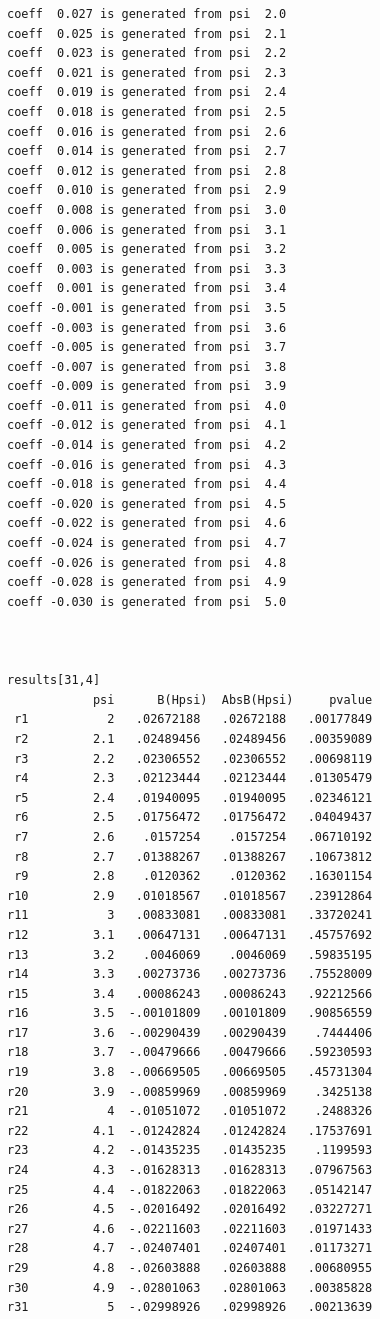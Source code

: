 \documentclass[
  10pt,
  a4paper,
]{book}
\begin{document}
\begin{verbatim}
coeff  0.027 is generated from psi  2.0
coeff  0.025 is generated from psi  2.1
coeff  0.023 is generated from psi  2.2
coeff  0.021 is generated from psi  2.3
coeff  0.019 is generated from psi  2.4
coeff  0.018 is generated from psi  2.5
coeff  0.016 is generated from psi  2.6
coeff  0.014 is generated from psi  2.7
coeff  0.012 is generated from psi  2.8
coeff  0.010 is generated from psi  2.9
coeff  0.008 is generated from psi  3.0
coeff  0.006 is generated from psi  3.1
coeff  0.005 is generated from psi  3.2
coeff  0.003 is generated from psi  3.3
coeff  0.001 is generated from psi  3.4
coeff -0.001 is generated from psi  3.5
coeff -0.003 is generated from psi  3.6
coeff -0.005 is generated from psi  3.7
coeff -0.007 is generated from psi  3.8
coeff -0.009 is generated from psi  3.9
coeff -0.011 is generated from psi  4.0
coeff -0.012 is generated from psi  4.1
coeff -0.014 is generated from psi  4.2
coeff -0.016 is generated from psi  4.3
coeff -0.018 is generated from psi  4.4
coeff -0.020 is generated from psi  4.5
coeff -0.022 is generated from psi  4.6
coeff -0.024 is generated from psi  4.7
coeff -0.026 is generated from psi  4.8
coeff -0.028 is generated from psi  4.9
coeff -0.030 is generated from psi  5.0



results[31,4]
            psi      B(Hpsi)  AbsB(Hpsi)     pvalue
 r1           2   .02672188   .02672188   .00177849
 r2         2.1   .02489456   .02489456   .00359089
 r3         2.2   .02306552   .02306552   .00698119
 r4         2.3   .02123444   .02123444   .01305479
 r5         2.4   .01940095   .01940095   .02346121
 r6         2.5   .01756472   .01756472   .04049437
 r7         2.6    .0157254    .0157254   .06710192
 r8         2.7   .01388267   .01388267   .10673812
 r9         2.8    .0120362    .0120362   .16301154
r10         2.9   .01018567   .01018567   .23912864
r11           3   .00833081   .00833081   .33720241
r12         3.1   .00647131   .00647131   .45757692
r13         3.2    .0046069    .0046069   .59835195
r14         3.3   .00273736   .00273736   .75528009
r15         3.4   .00086243   .00086243   .92212566
r16         3.5  -.00101809   .00101809   .90856559
r17         3.6  -.00290439   .00290439    .7444406
r18         3.7  -.00479666   .00479666   .59230593
r19         3.8  -.00669505   .00669505   .45731304
r20         3.9  -.00859969   .00859969    .3425138
r21           4  -.01051072   .01051072    .2488326
r22         4.1  -.01242824   .01242824   .17537691
r23         4.2  -.01435235   .01435235    .1199593
r24         4.3  -.01628313   .01628313   .07967563
r25         4.4  -.01822063   .01822063   .05142147
r26         4.5  -.02016492   .02016492   .03227271
r27         4.6  -.02211603   .02211603   .01971433
r28         4.7  -.02407401   .02407401   .01173271
r29         4.8  -.02603888   .02603888   .00680955
r30         4.9  -.02801063   .02801063   .00385828
r31           5  -.02998926   .02998926   .00213639


\end{verbatim}
\end{document}
